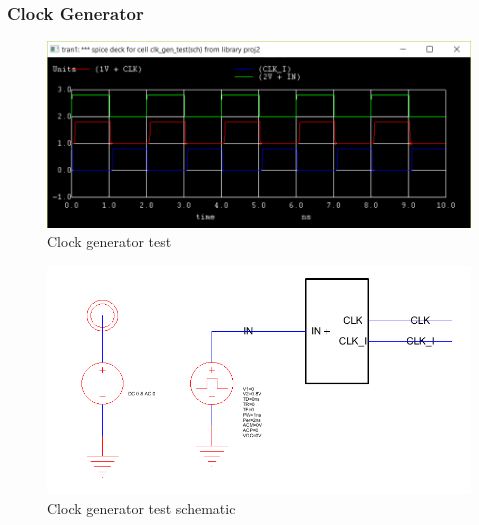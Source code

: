 \documentclass[12pt]{report}
\begin{document}
\subsubsection*{Clock Generator}
\begin{figure}[H]
  \centering
    \includegraphics[width=1.0\textwidth]{clk_gen_test.PNG}
  \caption{Clock generator test}
  \label{fig:clk_gen_test}
\end{figure}
\begin{figure}[H]
  \centering
    \includegraphics[width=1.0\textwidth]{TestSchematics/clk_gen.PNG}
  \caption{Clock generator test schematic}
\end{figure}
\end{document}
